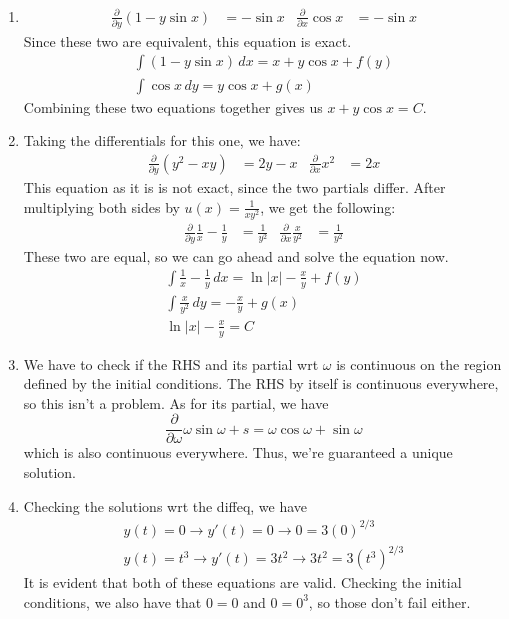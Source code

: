 \documentclass[12pt]{article}
\begin{document}
\begin{enumerate}
    \item \begin{align*}
              \frac{\partial}{\partial y} (1-y\sin x) & =-\sin x & \frac{\partial}{\partial x} \cos x & = -\sin x
          \end{align*}
          Since these two are equivalent, this equation is exact.
          \begin{gather*}
              \int (1-y\sin x)\,dx =x+y \cos x +f(y) \\
              \int \cos x\,dy=y \cos x+g(x)
          \end{gather*}
          Combining these two equations together gives us $\boxed{x+y \cos x=C}$.
    \item Taking the differentials for this one, we have:
          \begin{align*}
              \frac{\partial}{\partial y} (y^2-xy) & =2y-x & \frac{\partial}{\partial x} x^2 & = 2x
          \end{align*}
          This equation as it is is not exact, since the two partials differ.
          After multiplying both sides by $u(x)=\frac{1}{xy^2}$, we get the following:
          \begin{align*}
              \frac{\partial}{\partial y} \frac{1}{x}-\frac{1}{y} & =\frac{1}{y^2}
                                                                  & \frac{\partial}{\partial x} \frac{x}{y^2} & = \frac{1}{y^2}
          \end{align*}
          These two are equal, so we can go ahead and solve the equation now.
          \begin{gather*}
              \int \frac{1}{x}-\frac{1}{y}\,dx=\ln |x| - \frac{x}{y}+f(y) \\
              \int \frac{x}{y^2}\,dy=-\frac{x}{y}+g(x) \\
              \boxed{\ln |x|-\frac{x}{y}=C}
          \end{gather*}
    \item We have to check if the RHS and its partial wrt $\omega$ is continuous on the region defined by the initial conditions.
          The RHS by itself is continuous everywhere, so this isn't a problem.
          As for its partial, we have \[\frac{\partial}{\partial \omega} \omega \sin \omega +s=\omega \cos \omega+\sin \omega\]
          which is also continuous everywhere.
          Thus, we're guaranteed a unique solution.
    \item Checking the solutions wrt the diffeq, we have
          \begin{gather*}
              y(t)=0 \rightarrow y'(t)=0 \rightarrow 0=3(0)^{2/3} \\
              y(t)=t^3 \rightarrow y'(t)=3t^2 \rightarrow 3t^2=3(t^3)^{2/3}
          \end{gather*}
          It is evident that both of these equations are valid.
          Checking the initial conditions, we also have that $0=0$ and $0=0^3$, so those don't fail either.


\end{enumerate}
\end{document}
